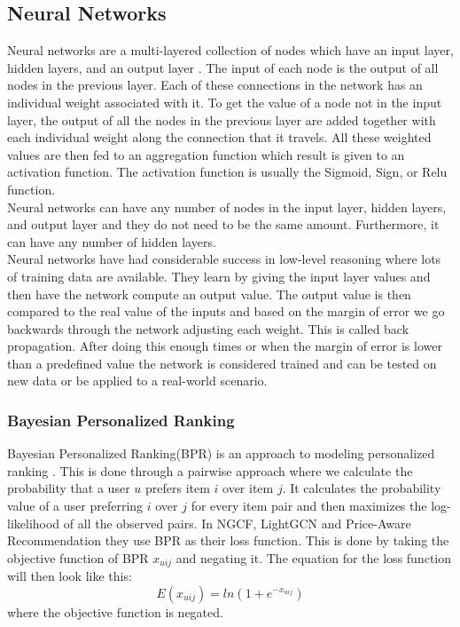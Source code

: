 \subsection{Neural Networks}
Neural networks are a multi-layered collection of nodes which have an input layer, hidden layers, and an output layer \cite{AI-book}.
The input of each node is the output of all nodes in the previous layer.
Each of these connections in the network has an individual weight associated with it.
To get the value of a node not in the input layer, the output of all the nodes in the previous layer are added together with each individual weight along the connection that it travels.
All these weighted values are then fed to an aggregation function which result is given to an activation function.
The activation function is usually the Sigmoid, Sign, or Relu function.
\\
Neural networks can have any number of nodes in the input layer, hidden layers, and output layer and they do not need to be the same amount.
Furthermore, it can have any number of hidden layers.
\\
Neural networks have had considerable success in low-level reasoning where lots of training data are available.
They learn by giving the input layer values and then have the network compute an output value.
The output value is then compared to the real value of the inputs and based on the margin of error we go backwards through the network adjusting each weight.
This is called back propagation.
After doing this enough times or when the margin of error is lower than a predefined value the network is considered trained and can be tested on new data or be applied to a real-world scenario.

\subsubsection{Bayesian Personalized Ranking}
Bayesian Personalized Ranking(BPR) is an approach to modeling personalized ranking \cite{BPR}.
This is done through a pairwise approach where we calculate the probability that a user $u$ prefers item $i$ over item $j$.
It calculates the probability value of a user preferring $i$ over $j$ for every item pair and then maximizes the log-likelihood of all the observed pairs.
In NGCF, LightGCN and Price-Aware Recommendation they use BPR as their loss function.
This is done by taking the objective function of BPR $x_{uij}$ and negating it.
The equation for the loss function will then look like this:
\[E(x_{uij}) = ln(1+e^{-x_{uij}})\]
where the objective function is negated.


